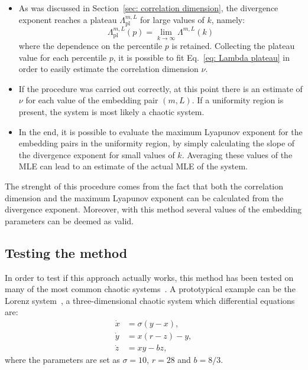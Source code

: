 \begin{itemize}
\item
As was discussed in Section~\ref{sec: correlation dimension}, the divergence exponent reaches a plateau
$\Lambda_{\text{pl}}^{m,L}$ for large values of $k$, namely:
\begin{equation}
    \label{eq: Lambda plateau k infinity}
    \Lambda_{\text{pl}}^{m,L}(p) = \lim_{k\rightarrow \infty}\Lambda^{m,L}(k)
\end{equation}
where the dependence on the percentile $p$ is retained.
Collecting the plateau value for each percentile $p$, it is possible to fit Eq.~\ref{eq: Lambda plateau}
in order to easily estimate the correlation dimension $\nu$.


\item
If the procedure was carried out correctly, at this point there is an estimate of $\nu$ for each
value of the embedding pair $(m,L)$. If a uniformity region is present, the system is most likely
a chaotic system.


\item
In the end, it is possible to evaluate the
maximum Lyapunov exponent for the embedding pairs in the uniformity region, by simply calculating
the slope of the divergence exponent for small values of $k$. Averaging these values of the MLE
can lead to an estimate of the actual MLE of the system.

\end{itemize}

The strenght of this procedure comes from the fact that both the correlation dimension and the
maximum Lyapunov exponent can be calculated from the divergence exponent.
Moreover, with this method several
values of the embedding parameters can be deemed as valid.


\subsection{Testing the method}\label{subsec: testing the procedure}

In order to test if this approach actually works, this method has been tested on many of the most
common chaotic systems~\cite{ref:perinelli2020chasing}. 
A prototypical example can be the Lorenz system~\cite{lorenz1963deterministic}, a three-dimensional
chaotic system which differential equations are:
\begin{equation}
\label{eq: Lorenz system}
\begin{aligned}
    \dot{x}&=\sigma(y-x),\\
    \dot{y}&=x(r-z)-y,\\
    \dot{z}&=xy-bz,
\end{aligned}
\end{equation}
where the parameters are set as $\sigma=10$, $r=28$ and $b=8/3$.


